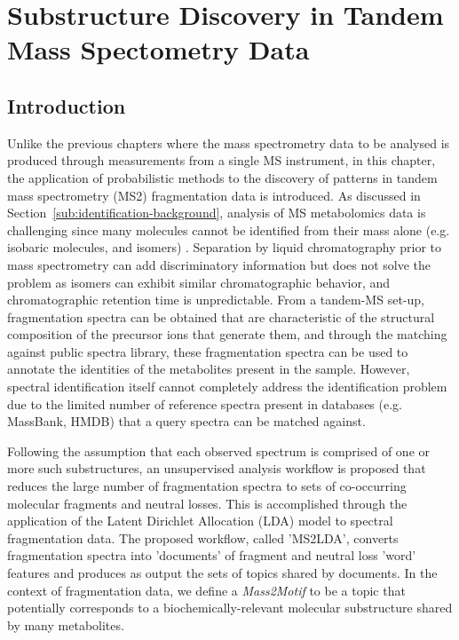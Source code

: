 \chapter{Substructure Discovery in Tandem Mass Spectometry Data}
\label{c:background}

\section{Introduction}

Unlike the previous chapters where the mass spectrometry data to be analysed is produced through measurements from a single MS instrument, in this chapter, the application of probabilistic methods to the discovery of patterns in tandem mass spectrometry (MS2) fragmentation data is introduced. As discussed in Section~\ref{sub:identification-background}, analysis of MS metabolomics data is challenging since many molecules cannot be identified from their mass alone (e.g. isobaric molecules, and isomers) \cite{VanderHooft2013, Kind2006}. Separation by liquid chromatography prior to mass spectrometry can add discriminatory information but does not solve the problem as isomers can exhibit similar chromatographic behavior, and chromatographic retention time is unpredictable. From a tandem-MS set-up, fragmentation spectra can be obtained that are characteristic of the structural composition of the precursor ions that generate them, and through the matching against public spectra library, these fragmentation spectra can be used to annotate the identities of the metabolites present in the sample. However, spectral identification itself cannot completely address the identification problem due to the limited number of reference spectra present in databases (e.g. MassBank, HMDB) that a query spectra can be matched against. 

Following the assumption that each observed spectrum is comprised of one or more such substructures, an unsupervised analysis workflow is proposed that reduces the large number of fragmentation spectra to sets of co-occurring molecular fragments and neutral losses. This is accomplished through the application of the Latent Dirichlet Allocation (LDA) model to spectral fragmentation data. The proposed workflow, called 'MS2LDA', converts fragmentation spectra into 'documents' of fragment and neutral loss 'word' features and produces as output the sets of topics shared by documents. In the context of fragmentation data, we define a \textit{Mass2Motif} to be a topic that potentially corresponds to a biochemically-relevant molecular substructure shared by many metabolites. 

